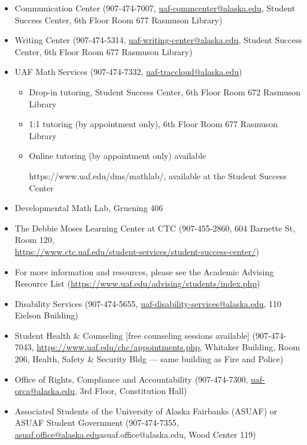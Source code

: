 \documentclass[11pt]{article}
\def\mailto#1{\href{mailto:#1}{#1}}
\begin{document}
\begin{itemize}
\setlength\itemsep{0em}
        \item Communication Center (907-474-7007, \mailto{uaf-commcenter@alaska.edu}, Student Success Center, 6th Floor Room 677 Rasmuson Library)
        \item Writing Center (907-474-5314, \mailto{uaf-writing-center@alaska.edu}, Student Success Center, 6th Floor Room 677 Rasmuson Library)
\item UAF Math Services (907-474-7332, \mailto{uaf-traccloud@alaska.edu})


\begin{itemize}
\item Drop-in tutoring, Student Success Center, 6th Floor Room 672 Rasmuson Library

\item 1:1 tutoring (by appointment only), 6th Floor Room 677 Rasmuson Library

\item Online tutoring (by appointment only) available

https://www.uaf.edu/dms/mathlab/, available at the Student Success Center
\end{itemize}

\item Developmental Math Lab, Gruening 406
\item The Debbie Moses Learning Center at CTC (907-455-2860, 604 Barnette St, Room 120,\\ \url{https://www.ctc.uaf.edu/student-services/student-success-center/})
\item For more information and resources, please see the Academic Advising Resource List (\url{https://www.uaf.edu/advising/students/index.php})
\end{itemize}

\begin{itemize}
\setlength\itemsep{0em}
\item Disability Services (907-474-5655, \mailto{uaf-disability-services@alaska.edu}, 110 Eielson Building)
\item Student Health \& Counseling [free counseling sessions available] (907-474-7043, \url{https://www.uaf.edu/chc/appointments.php}, Whitaker Building, Room 206, Health, Safety \& Security Bldg --- same building as Fire and Police)
\item Office of Rights, Compliance and Accountability (907-474-7300, \mailto{uaf-orca@alaska.edu}, 3rd Floor, Constitution Hall)
\item Associated Students of the University of Alaska Fairbanks (ASUAF) or ASUAF Student Government (907-474-7355, \mailto{asuaf.office@alaska.edu}{asuaf.office@alaska.edu}, Wood Center 119)
\end{itemize}
\end{document}
